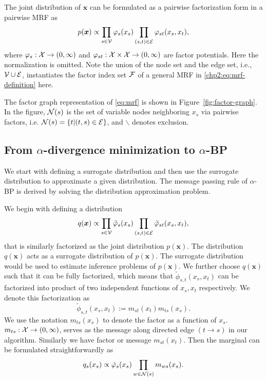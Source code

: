 The joint distribution of $\bm{x}$ can be formulated as a pairwise factorization form in a pairwise MRF as
\begin{equation}\label{eq:mrf}
  p(\bm{x}) \propto \prod_{{s\in \mathcal{V}}} \varphi_s(x_s) \prod_{(s,t) \in \mathcal{E}} \varphi_{st}(x_s, x_t),
\end{equation}
where $\varphi_{s}: \mathcal{X} \rightarrow (0, \infty)$ and $\varphi_{st}: \mathcal{X} \times \mathcal{X} \rightarrow (0, \infty)$ are factor potentials. Here the normalization is omitted. Note the union of the node set and the edge set, i.e., $\mathcal{V} \cup \mathcal{E}$, instantiates the factor index set $\mathcal{F}$ of a general MRF in \eqref{chp2:eq:mrf-definition} here.

The factor graph representation of \eqref{eq:mrf} is shown in
Figure~\ref{fig:factor-graph}. In the figure, $\mathcal{N}(s)$ is the set of variable nodes neighboring $x_s$ via
pairwise factors, i.e. $\mathcal{N}(s) = \left\{ t|(t,s) \in \mathcal{E} \right\}$, and $\backslash$ denotes exclusion.

\subsection{From $\alpha$-divergence minimization to $\alpha$-BP}
We start with defining a surrogate distribution and then use the surrogate distribution to approximate a given distribution. The message passing rule of $\alpha$-BP is derived by solving the distribution approximation problem.

We begin with defining a distribution
\begin{equation}
  q(\bm{x}) \propto \prod_{{s\in \mathcal{V}}} \tilde{\varphi}_s(x_s) \prod_{(s,t) \in \mathcal{E}} \tilde{\varphi}_{st}(x_s, x_t),
\end{equation}
that is similarly factorized as the joint distribution $p(\bm{x})$. The distribution $q(\bm{x})$ acts as a surrogate distribution of $p(\bm{x})$. The surrogate distribution would be used to estimate inference problems of $p(\bm{x})$. We further choose $q(\bm{x})$ such that it can be fully factorized, which means that $\tilde{\phi}_{s,t}(x_s, x_t)$ can be factorized into product of two independent functions of $x_s, x_t$ respectively. We denote this factorization as
\begin{equation}
  \tilde{\phi}_{s,t}(x_s, x_t) := m_{st}(x_t) m_{ts}(x_s).
\end{equation}
We use the notation $m_{ts}(x_s)$ to denote the factor as a function of $x_s$. $m_{ts}: \mathcal{X} \rightarrow (0, \infty)$, serves as the message along directed edge $(t \rightarrow s)$ in our algorithm. Similarly we have factor or message $m_{st}(x_t)$. Then the marginal can be formulated straightforwardly as
\begin{equation}
  q_s(x_s) \propto \tilde{\varphi}_s(x_s) \prod_{w\in \mathcal{N}(s)} m_{ws}(x_s).
\end{equation}

